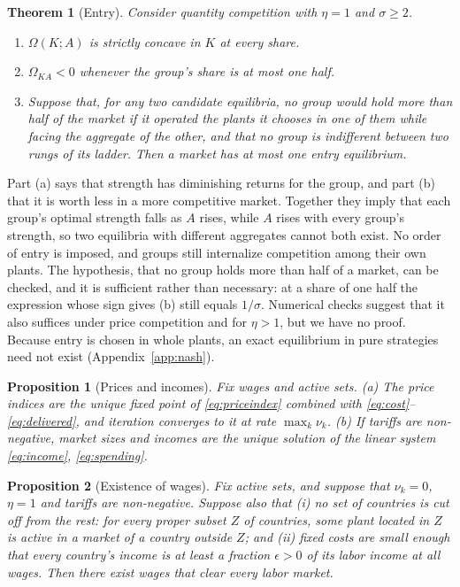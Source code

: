 \documentclass[11pt]{article}
\newtheorem{proposition}{Proposition}
\newtheorem{theorem}{Theorem}
\theoremstyle{definition}
\theoremstyle{remark}
\begin{document}
\begin{theorem}[Entry]\label{thm:entry}
Consider quantity competition with $\eta=1$ and $\sigma\ge2$.
\begin{enumerate}[label=(\alph*)]
\item $\Omega(K;A)$ is strictly concave in $K$ at every share.
\item $\Omega_{KA}<0$ whenever the group's share is at most one half.
\item Suppose that, for any two candidate equilibria, no group would hold more than
half of the market if it operated the plants it chooses in one of them while facing the
aggregate of the other, and that no group is indifferent between two rungs of its
ladder. Then a market has at most one entry equilibrium.
\end{enumerate}
\end{theorem}

\noindent Part (a) says that strength has diminishing returns for the group, and part
(b) that it is worth less in a more competitive market. Together they imply that each
group's optimal strength falls as $A$ rises, while $A$ rises with every group's strength,
so two equilibria with different aggregates cannot both exist. No order of entry is
imposed, and groups still internalize competition among their own plants. The
hypothesis, that no group holds more than half of a market, can be checked, and it is
sufficient rather than necessary: at a share of one half the expression whose sign
gives (b) still equals $1/\sigma$. Numerical checks suggest that it also suffices under
price competition and for $\eta>1$, but we have no proof. Because entry is chosen in
whole plants, an exact equilibrium in pure strategies need not exist
(Appendix~\ref{app:nash}).

\begin{proposition}[Prices and incomes]\label{prop:prices}
Fix wages and active sets. (a) The price indices are the unique fixed point of
\eqref{eq:priceindex} combined with \eqref{eq:cost}--\eqref{eq:delivered}, and
iteration converges to it at rate $\max_k\nu_k$. (b) If tariffs are non-negative, market
sizes and incomes are the unique solution of the linear system \eqref{eq:income},
\eqref{eq:spending}.
\end{proposition}

\begin{proposition}[Existence of wages]\label{prop:exist}
Fix active sets, and suppose that $\nu_k=0$, $\eta=1$ and tariffs are non-negative.
Suppose also that (i) no set of countries is cut off from the rest: for every proper
subset $Z$ of countries, some plant located in $Z$ is active in a market of a country
outside $Z$; and (ii) fixed costs are small enough that every country's income is at
least a fraction $\epsilon>0$ of its labor income at all wages. Then there exist wages
that clear every labor market.
\end{proposition}
\end{document}
